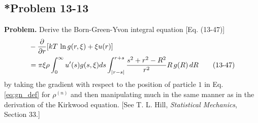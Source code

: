 \documentclass[twocolumn, 10pt]{article}
\numberwithin{equation}{section}
\newenvironment{problem}
{\par\medskip \color{problue}
  \textbf{Problem. }\ignorespaces}
{\medskip}
\begin{document}
\subsection{*Problem 13-13}

\begin{problem}
  Derive the Born-Green-Yvon integral equation [Eq. (13-47)]
  \begin{align}
    &-\frac{\partial}{\partial r}
    [kT \, \ln g(r, \xi) + \xi u(r)]
    \notag
    \\
    &=
    \pi\xi\rho\int_0^\infty u'(s) g(s, \xi) ds
    \int_{|r-s|}^{r+s}
    \frac{ s^2 + r^2 - R^2 }{ r^2 }
    R \,  g(R) \, dR
    \tag{13-47}
  \end{align}
  by taking the gradient with respect to the position of particle $1$
  in Eq. \eqref{eq:gn_def}
  for $\rho^{(n)}$ and then manipulating much in the same manner
  as in the derivation of the Kirkwood equation.
  [See T. L. Hill, \textit{Statistical Mechanics}, Section 33.]
\end{problem}
\end{document}
